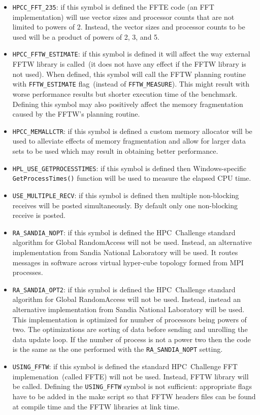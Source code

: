\documentclass[twocolumn]{article}
\begin{document}
\begin{itemize}
\item \texttt{HPCC\_FFT\_235}: if this symbol is defined the FFTE
code (an FFT implementation) will use vector sizes and processor
counts that are not limited to powers of 2. Instead, the vector sizes
and processor counts to be used will be a product of powers of 2, 3,
and 5.
\item \texttt{HPCC\_FFTW\_ESTIMATE}: if this symbol is defined it will
affect the way external FFTW library is called~(it does not have any
effect if the FFTW library is not used). When defined, this symbol
will call the FFTW planning routine with \texttt{FFTW\_ESTIMATE}
flag~(instead of \texttt{FFTW\_MEASURE}). This might result with worse
performance results but shorter execution time of the
benchmark. Defining this symbol may also positively affect the memory
fragmentation caused by the FFTW's planning routine.
\item \texttt{HPCC\_MEMALLCTR}: if this symbol is defined a custom
memory allocator will be used to alleviate effects of memory
fragmentation and allow for larger data sets to be used which may
result in obtaining better performance.
\item \texttt{HPL\_USE\_GETPROCESSTIMES}: if this symbol is defined
then Windows-specific \texttt{GetProcessTimes()} function will be used
to measure the elapsed CPU time.
\item \texttt{USE\_MULTIPLE\_RECV}: if this symbol is defined then multiple non-blocking
receives will be posted simultaneously. By default only one non-blocking
receive is posted.
\item \texttt{RA\_SANDIA\_NOPT}: if this symbol is defined the
HPC~Challenge standard algorithm for Global RandomAccess will not be
used. Instead, an alternative implementation from Sandia
National Laboratory will be used. It routes messages in software
across virtual hyper-cube topology formed from MPI processes.
\item \texttt{RA\_SANDIA\_OPT2}: if this symbol is defined the
HPC~Challenge standard algorithm for Global RandomAccess will not be
used. Instead, instead an alternative implementation from Sandia
National Laboratory will be used. This implementation is optimized for
number of processors being powers of two. The optimizations
are sorting of data before sending and unrolling the data update
loop. If the number of process is not a power two then the code
is the same as the one performed with the \texttt{RA\_SANDIA\_NOPT} setting.
\item \texttt{USING\_FFTW}: if this symbol is defined the standard
HPC~Challenge FFT implemenation~(called FFTE) will not be used.
Instead, FFTW library will be called. Defining the
\texttt{USING\_FFTW} symbol is not sufficient: appropriate flags have
to be added in the make script so that FFTW headers files can be found
at compile time and the FFTW libraries at link time.
\end{itemize}
\end{document}
